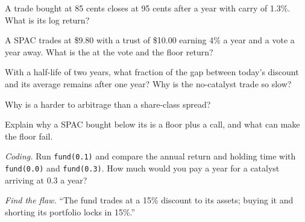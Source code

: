 \begin{exercise}[$\star$]\label{exo:s1:share-classes-holding-companies-closed-end-funds-spacs:2}
A trade bought at 85 cents closes at 95 cents after a year with carry of 1.3\%. What is its log return?
\end{exercise}

\begin{exercise}[$\star$]\label{exo:s1:share-classes-holding-companies-closed-end-funds-spacs:3}
A SPAC trades at \$9.80 with a trust of \$10.00 earning 4\% a year and a vote a year away. What is the  at the vote and the floor return?
\end{exercise}

\begin{exercise}[$\star\star$]\label{exo:s1:share-classes-holding-companies-closed-end-funds-spacs:4}
With a half-life of two years, what fraction of the gap between today's discount and its average remains after one year? Why is the no-catalyst trade so
slow?
\end{exercise}

\begin{exercise}[$\star\star$]\label{exo:s1:share-classes-holding-companies-closed-end-funds-spacs:5}
Why is a  harder to arbitrage than a share-class spread?
\end{exercise}

\begin{exercise}[$\star\star$]\label{exo:s1:share-classes-holding-companies-closed-end-funds-spacs:6}
Explain why a SPAC bought below its  is a floor plus a call, and what can make the floor fail.
\end{exercise}

\begin{exercise}[$\star\star\star$]\label{exo:s1:share-classes-holding-companies-closed-end-funds-spacs:7}
\emph{Coding.} Run \texttt{fund(0.1)} and compare the annual return and holding time with \texttt{fund(0.0)} and \texttt{fund(0.3)}. How much would you pay a
year for a catalyst arriving at 0.3 a year?
\end{exercise}

\begin{exercise}[$\star\star\star$]\label{exo:s1:share-classes-holding-companies-closed-end-funds-spacs:8}
\emph{Find the flaw.} ``The fund trades at a 15\% discount to its assets; buying it and shorting its portfolio locks in 15\%.''
\end{exercise}

